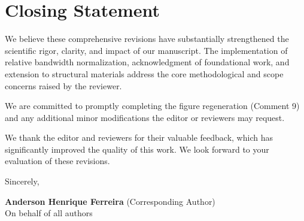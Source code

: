 \documentclass[11pt,a4paper]{article}
\begin{document}
\section*{Closing Statement}

We believe these comprehensive revisions have substantially strengthened the scientific rigor, clarity, and impact of our manuscript. The implementation of relative bandwidth normalization, acknowledgment of foundational work, and extension to structural materials address the core methodological and scope concerns raised by the reviewer.

We are committed to promptly completing the figure regeneration (Comment 9) and any additional minor modifications the editor or reviewers may request.

We thank the editor and reviewers for their valuable feedback, which has significantly improved the quality of this work. We look forward to your evaluation of these revisions.

\vspace{1cm}

Sincerely,

\vspace{1cm}

\textbf{Anderson Henrique Ferreira} (Corresponding Author)\\
On behalf of all authors
\end{document}
